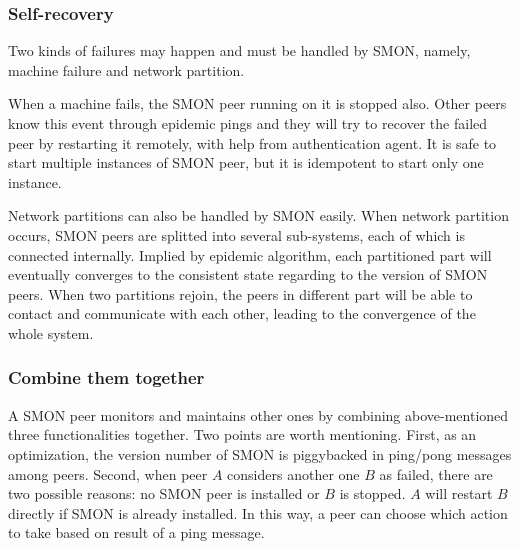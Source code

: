 \subsubsection*{Self-recovery}

Two kinds of failures may happen and must be handled by
SMON, namely, machine failure and network partition.

When a machine fails, the SMON peer running on it is stopped
also. Other peers know this event through epidemic pings and
they will try to recover the failed peer by restarting it
remotely, with help from authentication agent. It is safe to
start multiple instances of SMON peer, but it is idempotent
to start only one instance.

Network partitions can also be handled by SMON easily. When
network partition occurs, SMON peers are splitted into
several sub-systems, each of which is connected internally.
Implied by epidemic algorithm, each partitioned part will
eventually converges to the consistent state regarding to
the version of SMON peers. When two partitions rejoin, the
peers in different part will be able to contact and
communicate with each other, leading to the convergence of
the whole system.

\subsubsection*{Combine them together}

A SMON peer monitors and maintains other ones by combining
above-mentioned three functionalities together.  Two points are
worth mentioning. First, as an optimization, the version
number of SMON is piggybacked in ping/pong messages among
peers.  Second, when peer $A$ considers another one $B$ as
failed, there are two possible reasons: no SMON peer is
installed or $B$ is stopped. $A$ will restart $B$ directly
if SMON is already installed. In this way, a peer can choose
which action to take based on result of a ping message.


